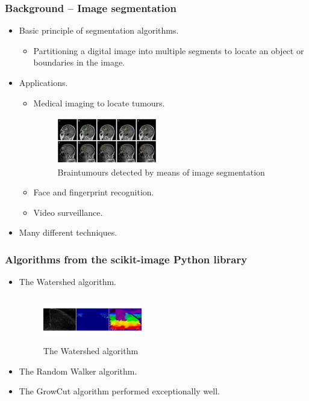 \documentclass{beamer}
\newcommand{\myitem}{\item[$-$]}
\begin{document}
\begin{frame}
\frametitle{Background -- Image segmentation}
\begin{itemize}
\item Basic principle of segmentation algorithms.
\begin{itemize}
\myitem Partitioning a digital image into multiple segments to locate an object or
boundaries in the image.
\end{itemize}
\pause
\item Applications.
\begin{itemize}
\myitem Medical imaging to locate tumours.
\begin{figure}
 \centering
 \includegraphics[width=1.7in, height=0.8in]{braintumor.jpg}
 \caption{Braintumours detected by means of image segmentation}
 \end{figure}
\myitem Face and fingerprint recognition.
\myitem Video surveillance.
\end{itemize}
\pause
\item Many different techniques.
\end{itemize}
\end{frame}

\begin{frame}
\frametitle{Algorithms from the scikit-image Python library}
\begin{itemize}
\item The Watershed\cite{scikit-image} algorithm.
\begin{figure}
 \centering
 \includegraphics[width=1.7in, height=0.8in]{watershed.png}
 \caption{The Watershed algorithm}
 \end{figure}
\item The Random Walker\cite{scikit-image} algorithm.
\pause
\item The GrowCut algorithm performed exceptionally well.
\end{itemize}
\end{frame}
\end{document}

